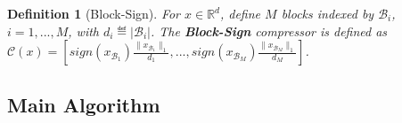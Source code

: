 \documentclass[11pt]{article}
\newtheorem{definition}{Definition}
\newcommand{\algo}{\textsc{eff-EBM}}
\begin{document}
\begin{definition}[Block-Sign]\label{def:sign}
For $x\in\mathbb R^d$, define $M$ blocks indexed by $\mathcal B_i$, $i=1,...,M$, with $d_i\eqdef |\mathcal B_i|$. The \textbf{Block-Sign} compressor is defined as $\mathcal C(x)=[sign(x_{\mathcal B_1})\frac{\|x_{\mathcal B_1}\|_1}{d_1},..., sign(x_{\mathcal B_M}) \frac{\|x_{\mathcal B_M}\|_1}{d_M}]$. 
\end{definition}






\subsection{Main Algorithm}


\end{document}
